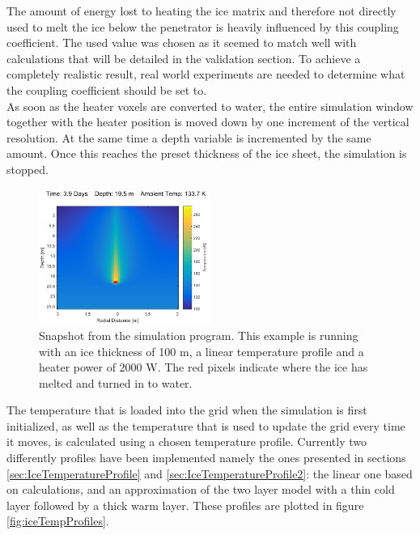 \noindent
The amount of energy lost to heating the ice matrix and therefore not directly used to melt the ice below the penetrator is heavily influenced by this coupling coefficient. The used value was chosen as it seemed to match well with calculations that will be detailed in the validation section. To achieve a completely realistic result, real world experiments are needed to determine what the coupling coefficient should be set to.\\

\noindent
As soon as the heater voxels are converted to water, the entire simulation window together with the heater position is moved down by one increment of the vertical resolution. At the same time a depth variable is incremented by the same amount. Once this reaches the preset thickness of the ice sheet, the simulation is stopped. \\

 \begin{figure}[ht]
 	\centering
 	\includegraphics[width=0.5\textwidth]{figures/LAMC/snapshot.pdf}
 	\caption{Snapshot from the simulation program. This example is running with an ice thickness of 100 m, a linear temperature profile and a heater power of 2000 W. The red pixels indicate where the ice has melted and turned in to water.}
 	\label{fig:simSnapshot}
 \end{figure}

\noindent
The temperature that is loaded into the grid when the simulation is first initialized, as well as the temperature that is used to update the grid every time it moves, is calculated using a chosen temperature profile. Currently two differently profiles have been implemented namely the ones presented in sections \ref{sec:IceTemperatureProfile} and \ref{sec:IceTemperatureProfile2}: the linear one based on calculations, and an approximation of the two layer model with a thin cold layer followed by a thick warm layer. These profiles are plotted in figure \ref{fig:iceTempProfiles}.\\

